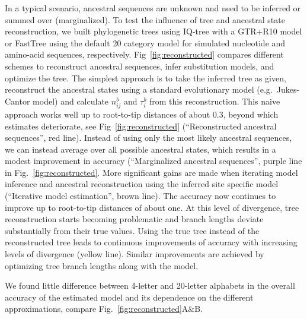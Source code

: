 \documentclass[aps,rmp,twocolumn]{revtex4}
\begin{document}
In a typical scenario, ancestral sequences are unknown and need to be inferred or summed over (marginalized).
To test the influence of tree and ancestral state reconstruction, we built phylogenetic trees using IQ-tree \citep{nguyen_iq-tree:_2015} with a GTR+R10 model or FastTree \citep{FastTree} using the default 20 category model for simulated nucleotide and amino-acid sequences, respectively.
Fig~\ref{fig:reconstructed} compares different schemes to reconstruct ancestral sequences, infer substitution models, and optimize the tree.
The simplest approach is to take the inferred tree as given, reconstruct the ancestral states using a standard evolutionary model (e.g.~Jukes-Cantor model) and calculate $n^b_{ij}$ and $\tau_i^b$ from this reconstruction.
This naive approach works well up to root-to-tip distances of about 0.3, beyond which estimates deteriorate, see Fig~\ref{fig:reconstructed} (``Reconstructed ancestral sequences'', red line).
Instead of using only the most likely ancestral sequences, we can instead average over all possible ancestral states, which results in a modest improvement in accuracy (``Marginalized ancestral sequences'', purple line in Fig.~\ref{fig:reconstructed}.
More significant gains are made when iterating model inference and ancestral reconstruction using the inferred site specific model (``Iterative model estimation'', brown line).
The accuracy now continues to improve up to root-to-tip distances of about one.
At this level of divergence, tree reconstruction starts becoming problematic and branch lengths deviate substantially from their true values.
Using the true tree instead of the reconstructed tree leads to continuous improvements of accuracy with increasing levels of divergence (yellow line).
Similar improvements are achieved by optimizing tree branch lengths along with the model.

We found little difference between 4-letter and 20-letter alphabets in the overall accuracy of the estimated model and its dependence on the different approximations, compare Fig.~\ref{fig:reconstructed}A\&B.
\end{document}
